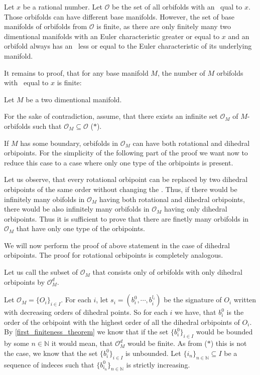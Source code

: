 Let $x$ be a rational number. 
Let $\mathcal{O}$ be the set of all orbifolds with 
an \Eoc\ qual to $x$. 
Those orbifolds can have different base manifolds. However, the set of base manifolds of 
orbifolds from $\mathcal{O}$ is finite, as there are only finitely many 
two dimentional manifolds with an Euler characteristic greater or equal to $x$ and an 
orbifold always has 
an \Eoc\ less or equal to the Euler characteristic of its underlying manifold. 

It remains to proof, that for any base manifold $M$, the number of $M$ orbifolds 
with \Eoc\ equal to $x$ is finite: 

Let $M$ be a two dimentional manifold. 

For the sake of contradiction, assume, that there exists an infinite set $\mathcal{O}_M$
of $M$-orbifolds such that $\mathcal{O}_M \subseteq \mathcal{O}$ ($\ast$).

If $M$ has some boundary, orbifolds in $\mathcal{O}_M$ 
can have both rotational and dihedral orbipoints. 
For the simplicity of the following part of the proof we want now to reduce this case 
to a case 
where only one type of the orbipoints is present. 

Let us observe, that every rotational orbipoint can be replaced by two dihedral orbipoints 
of the same order without changing the \Eoc. Thus, if there would be infinitely many 
obifolds in $\mathcal{O}_M$ having both rotational and dihedral orbipoints, there would be 
also infinitely many orbifolds in $\mathcal{O}_M$ having only dihedral orbipoints. 
Thus it is sufficient to prove that there are finetly many orbifolds in $\mathcal{O}_M$ 
that have only one type of the orbipoints. 

We will now perform the proof of above statement in the case of dihedral orbipoints.
The proof for rotational orbipoints is completely analogous. 

Let us call the subset of $\mathcal{O}_M$ 
that consists only of orbifolds with only dihedral orbipoints by $\mathcal{O}_M^d$.

Let $\mathcal{O}_M = \{O_i\}_{i \in I}$. 
For each $i$, let $s_i = (b^0_i, \cdots, b^{l_i}_i)$ be the signature 
of $O_i$ written with decreasing orders of 
dihedral points. So for each $i$ we have, that $b^0_i$ is 
the order of the orbipoint with the highest order of all the dihedral orbipoints of 
$O_i$. 
By \ref{first_finiteness_theorem} we know that if the set $\{b^0_i\}_{i \in I}$ 
would be bounded 
by some $n \in \mathbb{N}$ it would mean, that $\mathcal{O}_M^d$ would be finite. As 
from ($\ast$) this is not the case, we know
that the set $\{b^0_i\}_{i \in I}$ is unbounded. 
Let $\{i_n\}_{n\in \mathbb{N}} \subseteq I$ be a sequence of indeces such that
$\{b^0_{i_n}\}_{n\in \mathbb{N}}$ is strictly increasing. 

